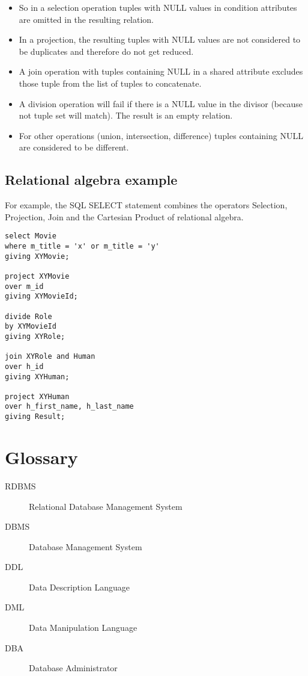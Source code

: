 \documentclass[a4paper,twocolumn]{article}
\begin{document}
\begin{itemize}
  \item So in a selection operation tuples with NULL values
        in condition attributes are omitted in the resulting
        relation.
  \item In a projection, the resulting tuples with NULL values
        are not considered to be duplicates and therefore do
        not get reduced.
  \item A join operation with tuples containing NULL in a
        shared attribute excludes those tuple from the list
        of tuples to concatenate.
  \item A division operation will fail if there is a NULL value
        in the divisor (because not tuple set will match). The
        result is an empty relation.
  \item For other operations (union, intersection, difference)
        tuples containing NULL are considered to be different.
\end{itemize}

\subsection{Relational algebra example}

For example, the SQL SELECT statement combines the operators Selection,
Projection, Join and the Cartesian Product of relational algebra.

\begin{verbatim}
select Movie
where m_title = 'x' or m_title = 'y'
giving XYMovie;

project XYMovie
over m_id
giving XYMovieId;

divide Role
by XYMovieId
giving XYRole;

join XYRole and Human
over h_id
giving XYHuman;

project XYHuman
over h_first_name, h_last_name
giving Result;
\end{verbatim}

\section{Glossary}

\begin{description}
  \item[RDBMS] Relational Database Management System
  \item[DBMS] Database Management System
  \item[DDL] Data Description Language
  \item[DML] Data Manipulation Language
  \item[DBA] Database Administrator
\end{description}
\end{document}
